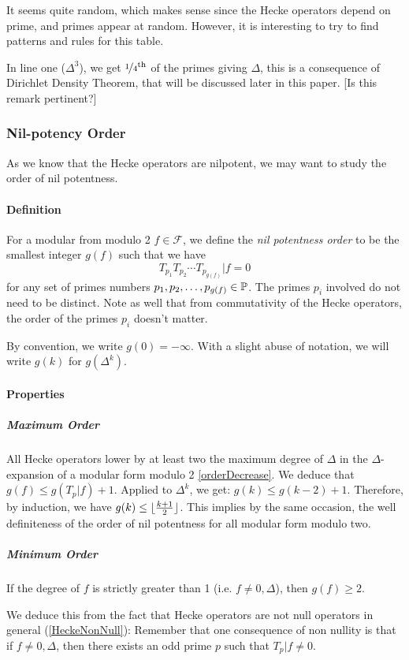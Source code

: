 It seems quite random, which makes sense since the Hecke operators depend on prime, and primes appear at random.
However, it is interesting to try to find patterns and rules for this table.

In line one ($\Delta^3$), we get $\nicefrac{1}{4}^{\text{th}}$ of the primes giving $\Delta$, this is a consequence of Dirichlet Density Theorem, that will be discussed later in this paper.
[Is this remark pertinent?]

\subsubsection{Nil-potency Order}
As we know that the Hecke operators are nilpotent, we may want to study the order of nil potentness.
\paragraph{Definition}
For a modular from modulo 2 $f \in \mathcal{F}$, we define the \textit{nil potentness order} to be the smallest integer $g(f)$ such that we have 
$$
T_{p_1} T_{p_2} \cdots T_{p_{g(f)}} | f = 0
$$
for any set of primes numbers $p_1, p_2, \dots, p_{g(f)} \in \mathbb{P}$.
The primes $p_i$ involved do not need to be distinct.
Note as well that from commutativity of the Hecke operators, the order of the primes $p_i$ doesn't matter.

By convention, we write $g(0)= -\infty$.
With a slight abuse of notation, we will write $g(k)$ for $g(\Delta^k)$.

\paragraph{Properties}
\subparagraph[Well-definiteness]{Maximum Order}
\label{MaximumOrderNilpotencyHeckeOperators}
All Hecke operators lower by at least two the maximum degree of $\Delta$ in the $\Delta$-expansion of a modular form modulo 2 \ref{orderDecrease}.
We deduce that $g(f) \leq g(T_p|f) + 1$.
Applied to $\Delta^k$, we get: $g(k) \leq g(k-2) + 1$.
Therefore, by induction, we have $g(k) \leq \lfloor \frac{k+1}{2} \rfloor$.
This implies by the same occasion, the well definiteness of the order of nil potentness for all modular form modulo two.

\subparagraph{Minimum Order}
\label{MinimumOrderNilpotencyHeckeOperators}
If the degree of $f$ is strictly greater than 1 (i.e. $f \neq 0, \Delta$), then $g(f) \geq 2$.

We deduce this from the fact that Hecke operators are not null operators in general (\ref{HeckeNonNull}):
Remember that one consequence of non nullity is that if $f \neq 0, \Delta$, then there exists an odd prime $p$ such that $T_p|f \neq 0$.


